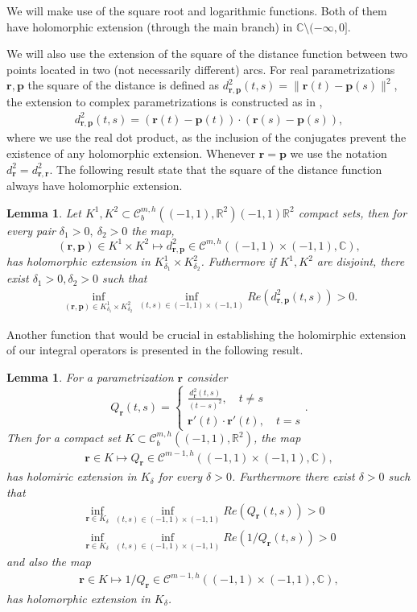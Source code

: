 \documentclass{article}
\newtheorem{lemma}[theorem]{Lemma}
\newcommand{\IC}{{\mathbb C}}
\newcommand{\IR}{{\mathbb R}}
\newcommand{\bp}{{\bm p}}
\newcommand{\cmspaceh}[4]{\mathcal{C}^{#1,#2} \left( #3, #4 \right)}
\newcommand{\rgeoh}[2]{\mathcal{C}_b^{#1,#2}\left( (-1,1), \IR^2 \right)}
\newcommand{\br}{\bm{r}}
\newcommand{\iinterv}{(-1,1)\times(-1,1)}
\begin{document}
We will make use of the square root and logarithmic functions. Both of them have holomorphic extension (through the main branch) in $\IC \setminus (-\infty,0]$.

We will also use the extension of the square of the distance function between two points located in two (not necessarily different) arcs. For real  parametrizations $\br,\bp$ the square of the distance is defined as $d_{\br,\bp}^2(t,s) = \| \br(t)-\bp(s)\|^2$, the extension to complex parametrizations is constructed as in \cite{Henriquez2021}, 
\begin{align*}
d^2_{\br,\bp}(t,s) = {(\br(t)-\bp(t))\cdot(\br(s)-\bp(s))},
\end{align*}
where we use the real dot product, as the inclusion of the conjugates prevent the existence of any holomorphic extension. Whenever $\br = \bp$ we use the notation $d^2_{\br} = d^2_{\br,\br}$. The following result state that the square of the distance function always have holomorphic extension.  
\begin{lemma} 
\label{lemma:squaredistance}
Let $K^1,K^2 \subset \rgeoh{m}{h}{(-1,1)}{\IR^2}$ compact sets, then for every pair $\delta_1>0, \ \delta_2 > 0$ the map, $$(\br,\bp) \in K^1 \times K^2 \mapsto d_{\br,\bp}^2 \in \cmspaceh{m}{h}{\iinterv}{\IC},$$has holomorphic extension in $K^1_{\delta_1} \times K^2_{\delta_2}$. Futhermore if $K^1,K^2$ are disjoint, there exist $\delta_1>0,\delta_2>0$ such that 
\begin{align*}
\inf_{(\br,\bp) \in K^1_{\delta_1}  \times K^2_{\delta_2}} 
\inf_{(t,s)\in \iinterv}
Re(d_{\br,\bp}^2(t,s))>0.
\end{align*}
\end{lemma}
Another function that would be crucial in establishing the holomirphic extension of our integral operators is presented in the following result.
\begin{lemma}
\label{lemma:Qfun}
For a parametrization $\br$ consider
$$
Q_{\br}(t,s) = \begin{cases}
\frac{d^2_{\br}(t,s)}{(t-s)^2}, \quad t\neq s \\
\br '(t) \cdot \br '(t), \quad t =s 
\end{cases}.
$$
Then for a compact set $K \subset \rgeoh{m}{h}$, the map  
\begin{align*}
\br \in K \mapsto Q_{\br} \in \cmspaceh{m-1}{h}{(-1,1)\times(-1,1)}{\IC},
\end{align*}
has holomiric extension in $K_\delta$ for every $\delta>0$. Furthermore there exist $\delta >0$ such that 
\begin{align*}
\inf_{\br \in K_\delta} \inf_{(t,s) \in (-1,1)\times (-1,1)} Re(Q_{\br}(t,s)) >0 \\
\inf_{\br \in K_\delta} \inf_{(t,s) \in (-1,1)\times (-1,1)} Re(1/Q_{\br}(t,s)) >0 
\end{align*}
and also the map 
\begin{align*}
\br \in K \mapsto 1/Q_{\br} \in \cmspaceh{m-1}{h}{(-1,1)\times(-1,1)}{\IC}, 
\end{align*} 
has holomorphic extension in $K_\delta$.
\end{lemma} 
\end{document}
